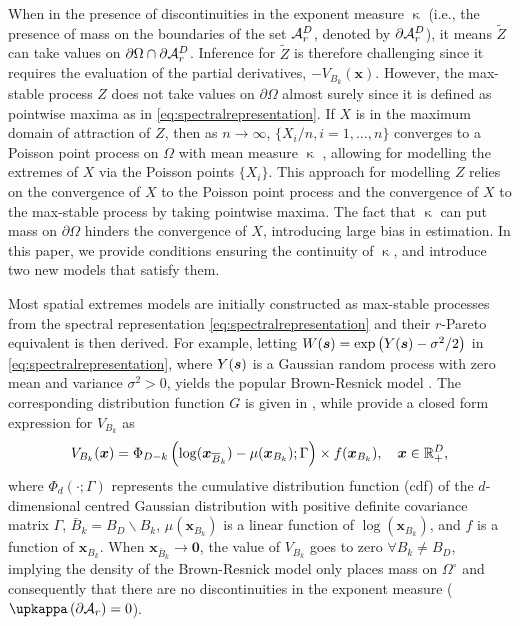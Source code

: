 \documentclass[12pt]{article}
\begin{document}
When in the presence of discontinuities in the exponent measure $\upkappa$ (i.e., the presence of mass on the boundaries of the set ${\mathcal A}_r^D$, denoted by $\partial{\mathcal A}_r^D$), it means $\tilde Z$ can take values on $\partial\Omega \cap \partial{\mathcal A}_r^D$. Inference for $\tilde Z$ is therefore challenging since it requires the evaluation of the partial derivatives, $-V_{B_k}(\bm x)$. 
However, the max-stable process $Z$ does not take values on $\partial\Omega$ almost surely since it is defined as pointwise maxima as in \eqref{eq:spectralrepresentation}. If $X$ is in the maximum domain of attraction of $Z$, then as $n\to\infty$, $\{X_i/n,i=1,\dots,n\}$ converges to a Poisson point process on $\Omega$ with mean measure $\upkappa$ \citep[Ch.~6]{Resnick:2006}, allowing for modelling the extremes of $X$ via the Poisson points $\{X_i\}$. This approach for modelling $Z$ relies on the convergence of $X$ to the Poisson point process and the convergence of $X$ to the max-stable process by taking pointwise maxima. The fact that $\upkappa$ can put mass on $\partial\Omega$ hinders the convergence of $X$, introducing large bias in estimation. In this paper, we provide conditions ensuring the continuity of $\upkappa$, and introduce two new models that satisfy them.


Most spatial extremes models are initially constructed as max-stable processes from the spectral representation \eqref{eq:spectralrepresentation} and their $r$-Pareto equivalent is then derived.
%
For example, letting $W({\boldsymbol{s}})=\exp \left(Y({\boldsymbol{s}}) - \sigma^2/2\right)$ in \eqref{eq:spectralrepresentation}, where $Y({\boldsymbol{s}})$ is a Gaussian random process with zero mean and variance $\sigma^2>0$, yields the popular Brown-Resnick model \citep{Brown.Resnick:1977, Kabluchko.etal:2009}. The corresponding distribution function $G$ is given in \citet{Huser.Davison:2013a}, while \cite{Wadsworth.Tawn:2014} provide a closed form expression for $V_{B_k}$ as
%
$$
V_{B_k}({\boldsymbol{x}}) = \Phi_{D-k}\left(\log({\boldsymbol{x}}_{{\overline{B}}_k}) - \mu({\boldsymbol{x}}_{B_k});\Gamma \right) \times f({\boldsymbol{x}}_{B_k}), \quad {\boldsymbol{x}} \in {\mathbb R}_+^D,
$$
%
where $\Phi_d(\cdot; \Gamma)$ represents the cumulative distribution function (cdf) of the $d$-dimensional centred Gaussian distribution with positive definite covariance matrix $\Gamma$, $\bar{B}_k = B_D \backslash B_k$, $\mu(\bm x_{B_k})$ is a linear function of $\log(\bm x_{B_k})$, 
and $f$ is a function of $\bm x_{B_k}$. When $\bm x_{\bar{B}_k}\to \bm 0$, the value of $V_{B_k}$ goes to zero $\forall B_k\neq B_D$, implying the density of the Brown-Resnick model only places mass on $\Omega^\circ$ 
and consequently that there are no discontinuities in the exponent measure ($\upkappa\left( \partial \calA_r\right)=0$).
\end{document}

